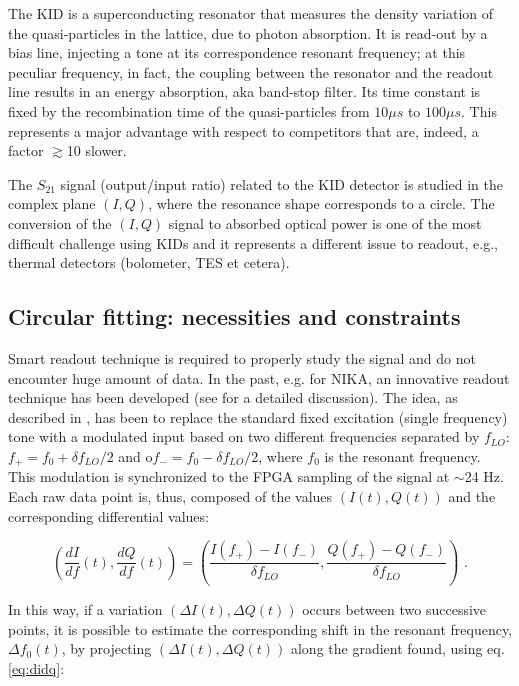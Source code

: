 \label{sec:acq}

The KID is a superconducting resonator that measures the density variation of the quasi-particles in the lattice, due to photon absorption. It is read-out by a bias line, injecting a tone at its correspondence resonant frequency; at this peculiar frequency, in fact, the coupling between the resonator and the readout line results in an energy absorption, aka band-stop filter. Its time constant is fixed by the recombination time of the quasi-particles from $10 \mu s$ to $100 \mu s$. This represents a major advantage with respect to competitors that are, indeed, a factor $\gtrsim$10 slower.

The $S_{21}$ signal (output/input ratio) related to the KID detector is studied in the complex plane $(I,Q)$, where the resonance shape corresponds to a circle.
The conversion of the $(I,Q)$ signal to absorbed optical power is one of the most difficult challenge using KIDs and it represents a different issue to readout, e.g., thermal detectors (bolometer, TES et cetera).

\subsection{Circular fitting: necessities and constraints}

Smart readout technique is required to properly study the signal and do not encounter huge amount of data. In the past, e.g. for NIKA, an innovative readout technique has been developed (see \cite{Calvo2013} for a detailed discussion). 
The idea, as described in \cite{Catalano2014} , has been to replace the standard fixed excitation (single frequency) tone with a modulated input based on two different frequencies separated by $f_{LO}$: $f_+ = f_0 + \delta f_{LO}/2$ and o$f_- = f_0 - \delta f_{LO}/2$, where $f_0$ is the resonant frequency. This modulation is synchronized to the FPGA sampling of the signal at $\sim$24 Hz. Each raw data point is, thus, composed of the values $(I(t), Q(t))$ and the corresponding differential values:

\begin{equation}
\left( \frac{dI}{df}(t),\frac{dQ}{df}(t) \right) = \left( \frac{I(f_+)-I(f_-)}{\delta f_{LO}}, \frac{Q(f_+)-Q(f_-)}{\delta f_{LO}} \right) \text{ .}
\label{eq:didq}
\end{equation}

\noindent In this way, if a variation $(\Delta I(t), \Delta Q(t))$ occurs between two successive points, it is possible to estimate the corresponding shift in the resonant frequency, $\Delta f_0(t)$, by projecting
$(\Delta I(t), \Delta Q(t))$ along the gradient found, using 
eq. \ref{eq:didq}:

